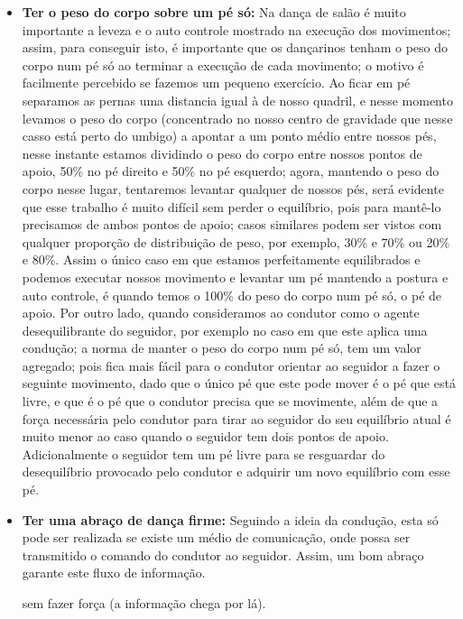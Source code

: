 \begin{itemize}
\item \textbf{Ter o peso do corpo sobre um pé só:} 
Na dança de salão é muito importante a leveza e o auto controle mostrado na 
execução dos movimentos; assim, para conseguir isto, é importante que os dançarinos
tenham o peso do corpo num pé só ao terminar a execução de cada movimento; o motivo
é facilmente percebido se fazemos um pequeno exercício. Ao ficar em pé separamos as
pernas uma distancia igual à de nosso quadril, e nesse momento levamos o peso do corpo
(concentrado no nosso centro de gravidade que nesse casso está perto do umbigo) a
apontar a um ponto médio entre nossos pés, nesse instante estamos dividindo o peso do corpo
entre nossos pontos de apoio, 50$\%$ no pé direito e 50$\%$ no pé esquerdo; agora, mantendo o peso
do corpo nesse lugar, tentaremos levantar qualquer de nossos pés, será evidente
que esse trabalho é muito difícil sem perder o equilíbrio, pois para mantê-lo
precisamos de ambos pontos de apoio; casos similares podem ser vistos com qualquer proporção de distribuição de peso,
por exemplo, 30$\%$ e 70$\%$ ou 20$\%$ e 80$\%$. Assim o único caso em que estamos
perfeitamente equilibrados e podemos executar nossos movimento e levantar um pé 
mantendo a postura e auto controle, é quando
temos o 100$\%$ do peso do corpo num pé só, o pé de apoio. 
Por outro lado, quando consideramos ao condutor como o agente desequilibrante do seguidor, por exemplo no caso
em que este aplica uma condução;
a norma de manter o peso do corpo num pé só, tem um valor agregado; 
pois fica mais fácil para o condutor orientar
ao seguidor a fazer o seguinte movimento, dado que o único pé que este pode mover é o pé
que está livre, e que é o pé que o condutor precisa que se movimente, 
além de que a força necessária pelo condutor para tirar ao seguidor do seu equilíbrio 
atual é muito menor ao caso quando o seguidor tem dois pontos de apoio.
Adicionalmente o seguidor tem um pé livre para se resguardar do desequilíbrio provocado pelo 
condutor e adquirir um novo equilíbrio com esse pé.

\item \textbf{Ter uma abraço de dança firme:} Seguindo a ideia da condução, esta só pode
ser realizada se existe um médio de comunicação, onde possa ser transmitido
o comando do condutor ao seguidor. Assim, um bom abraço garante este
fluxo de informação.

sem fazer força (a informação chega por lá).
\end{itemize}

